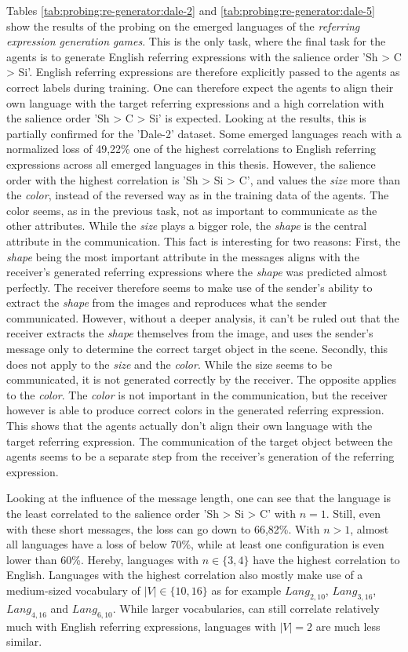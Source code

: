 Tables \ref{tab:probing:re-generator:dale-2} and \ref{tab:probing:re-generator:dale-5} show the results of the probing on the emerged languages of the \emph{referring expression generation games}.
This is the only task, where the final task for the agents is to generate English referring expressions with the salience order 'Sh > C > Si'.
English referring expressions are therefore explicitly passed to the agents as correct labels during training.
One can therefore expect the agents to align their own language with the target referring expressions and a high correlation with the salience order 'Sh > C > Si' is expected.
Looking at the results, this is partially confirmed for the 'Dale-2' dataset.
Some emerged languages reach with a normalized loss of 49,22\% one of the highest correlations to English referring expressions across all emerged languages in this thesis.
However, the salience order with the highest correlation is 'Sh > Si > C', and values the \emph{size} more than the \emph{color}, instead of the reversed way as in the training data of the agents.
The color seems, as in the previous task, not as important to communicate as the other attributes.
While the \emph{size} plays a bigger role, the \emph{shape} is the central attribute in the communication.
This fact is interesting for two reasons:
First, the \emph{shape} being the most important attribute in the messages aligns with the receiver's generated referring expressions where the \emph{shape} was predicted almost perfectly.
The receiver therefore seems to make use of the sender's ability to extract the \emph{shape} from the images and reproduces what the sender communicated.
However, without a deeper analysis, it can't be ruled out that the receiver extracts the \emph{shape} themselves from the image, and uses the sender's message only to determine the correct target object in the scene.
Secondly, this does not apply to the \emph{size} and the \emph{color}.
While the size seems to be communicated, it is not generated correctly by the receiver.
The opposite applies to the \emph{color}.
The \emph{color} is not important in the communication, but the receiver however is able to produce correct colors in the generated referring expression.
This shows that the agents actually don't align their own language with the target referring expression.
The communication of the target object between the agents seems to be a separate step from the receiver's generation of the referring expression.

Looking at the influence of the message length, one can see that the language is the least correlated to the salience order 'Sh > Si > C' with $n=1$.
Still, even with these short messages, the loss can go down to 66,82\%.
With $n>1$, almost all languages have a loss of below 70\%, while at least one configuration is even lower than 60\%.
Hereby, languages with $n \in \{3,4\}$ have the highest correlation to English.
Languages with the highest correlation also mostly make use of a medium-sized vocabulary of $|V| \in \{10,16\}$ as for example $Lang_{2,10}$, $Lang_{3,16}$, $Lang_{4,16}$ and $Lang_{6,10}$.
While larger vocabularies, can still correlate relatively much with English referring expressions, languages with $|V|=2$ are much less similar.

